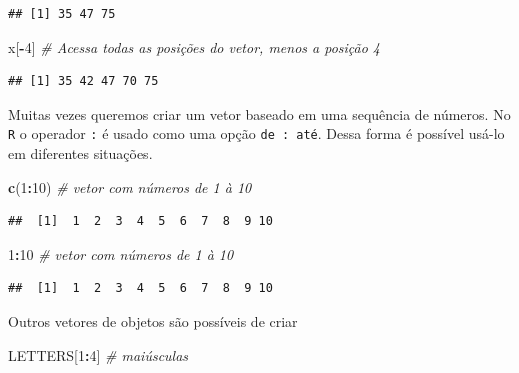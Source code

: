 \documentclass[
]{book}
\newenvironment{Shaded}{\begin{snugshade}}{\end{snugshade}}
\newcommand{\CommentTok}[1]{\textcolor[rgb]{0.56,0.35,0.01}{\textit{#1}}}
\newcommand{\DecValTok}[1]{\textcolor[rgb]{0.00,0.00,0.81}{#1}}
\newcommand{\KeywordTok}[1]{\textcolor[rgb]{0.13,0.29,0.53}{\textbf{#1}}}
\newcommand{\NormalTok}[1]{#1}
\newcommand{\OperatorTok}[1]{\textcolor[rgb]{0.81,0.36,0.00}{\textbf{#1}}}
\theoremstyle{definition}
\theoremstyle{definition}
\theoremstyle{definition}
\theoremstyle{remark}
\begin{document}
\begin{verbatim}
## [1] 35 47 75
\end{verbatim}

\begin{Shaded}
\begin{Highlighting}[]
\NormalTok{x[}\OperatorTok{-}\DecValTok{4}\NormalTok{]           }\CommentTok{# Acessa todas as posições do vetor, menos a posição 4}
\end{Highlighting}
\end{Shaded}

\begin{verbatim}
## [1] 35 42 47 70 75
\end{verbatim}

Muitas vezes queremos criar um vetor baseado em uma sequência de números. No \texttt{R} o operador \texttt{:} é usado como uma opção \texttt{de\ :\ até}. Dessa forma é possível usá-lo em diferentes situações.

\begin{Shaded}
\begin{Highlighting}[]
\KeywordTok{c}\NormalTok{(}\DecValTok{1}\OperatorTok{:}\DecValTok{10}\NormalTok{) }\CommentTok{# vetor com números de 1 à 10}
\end{Highlighting}
\end{Shaded}

\begin{verbatim}
##  [1]  1  2  3  4  5  6  7  8  9 10
\end{verbatim}

\begin{Shaded}
\begin{Highlighting}[]
\DecValTok{1}\OperatorTok{:}\DecValTok{10}    \CommentTok{# vetor com números de 1 à 10}
\end{Highlighting}
\end{Shaded}

\begin{verbatim}
##  [1]  1  2  3  4  5  6  7  8  9 10
\end{verbatim}

Outros vetores de objetos são possíveis de criar

\begin{Shaded}
\begin{Highlighting}[]
\NormalTok{LETTERS[}\DecValTok{1}\OperatorTok{:}\DecValTok{4}\NormalTok{] }\CommentTok{# maiúsculas}
\end{Highlighting}
\end{Shaded}
\end{document}
